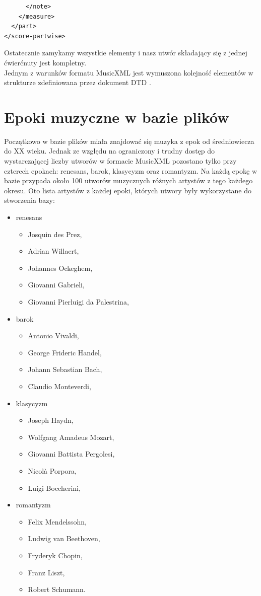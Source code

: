 \documentclass[printmode, eng, openany]{mgr}
\newcommand\tab[1][1cm]{\hspace*{#1}}
\begin{document}
\begin{lstlisting}
      </note>
    </measure>
  </part>
</score-partwise>
\end{lstlisting}
Ostatecznie zamykamy wszystkie elementy i nasz utwór składający się z jednej ćwierćnuty jest kompletny.\\

\tab Jednym z warunków formatu MusicXML jest wymuszona kolejność elementów w strukturze zdefiniowana przez dokument DTD \cite{mxml}. 
\section{Epoki muzyczne w bazie plików}
\tab Początkowo w bazie plików miała znajdować się muzyka z epok od średniowiecza do XX wieku. Jednak ze względu na ograniczony i trudny dostęp do wystarczającej liczby utworów w formacie MusicXML pozostano tylko przy czterech epokach: renesans, barok, klasycyzm oraz romantyzm. Na każdą epokę w bazie przypada około 100 utworów muzycznych różnych artystów z tego każdego okresu. Oto lista artystów z każdej epoki, których utwory były wykorzystane do stworzenia bazy:
\begin{itemize}
\item renesans
\begin{itemize}
\item Josquin des Prez,
\item Adrian Willaert,
\item Johannes Ockeghem,
\item Giovanni Gabrieli,
\item Giovanni Pierluigi da Palestrina,
\end{itemize}
\item barok
\begin{itemize}
\item Antonio Vivaldi,
\item George Frideric Handel,
\item Johann Sebastian Bach,
\item Claudio Monteverdi,
\end{itemize}
\item klasycyzm
\begin{itemize}
\item Joseph Haydn,
\item Wolfgang Amadeus Mozart,
\item Giovanni Battista Pergolesi,
\item Nicolà Porpora,
\item Luigi Boccherini,
\end{itemize}
\item romantyzm
\begin{itemize}
\item Felix Mendelssohn,
\item Ludwig van Beethoven,
\item Fryderyk Chopin,
\item Franz Liszt,
\item Robert Schumann.
\end{itemize}
\end{itemize}
\end{document}
